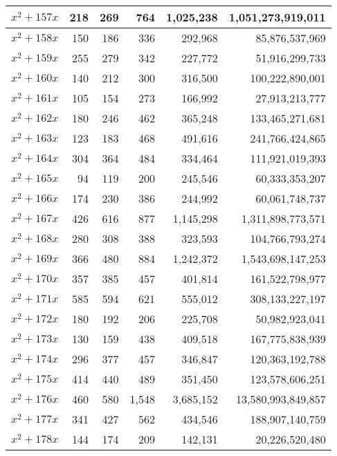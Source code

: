 \documentclass[a4paper]{amsproc}
\theoremstyle{plain}
\theoremstyle{named}
\begin{document}
\begin{longtable}{ | l | r | r | r | r | r | }
$x^2 + 157x$ & 218 & 269 & 764 & 1{,}025{,}238 & 1{,}051{,}273{,}919{,}011 \\ \hline
$x^2 + 158x$ & 150 & 186 & 336 & 292{,}968 & 85{,}876{,}537{,}969 \\ \hline
$x^2 + 159x$ & 255 & 279 & 342 & 227{,}772 & 51{,}916{,}299{,}733 \\ \hline
$x^2 + 160x$ & 140 & 212 & 300 & 316{,}500 & 100{,}222{,}890{,}001 \\ \hline
$x^2 + 161x$ & 105 & 154 & 273 & 166{,}992 & 27{,}913{,}213{,}777 \\ \hline
$x^2 + 162x$ & 180 & 246 & 462 & 365{,}248 & 133{,}465{,}271{,}681 \\ \hline
$x^2 + 163x$ & 123 & 183 & 468 & 491{,}616 & 241{,}766{,}424{,}865 \\ \hline
$x^2 + 164x$ & 304 & 364 & 484 & 334{,}464 & 111{,}921{,}019{,}393 \\ \hline
$x^2 + 165x$ & 94 & 119 & 200 & 245{,}546 & 60{,}333{,}353{,}207 \\ \hline
$x^2 + 166x$ & 174 & 230 & 386 & 244{,}992 & 60{,}061{,}748{,}737 \\ \hline
$x^2 + 167x$ & 426 & 616 & 877 & 1{,}145{,}298 & 1{,}311{,}898{,}773{,}571 \\ \hline
$x^2 + 168x$ & 280 & 308 & 388 & 323{,}593 & 104{,}766{,}793{,}274 \\ \hline
$x^2 + 169x$ & 366 & 480 & 884 & 1{,}242{,}372 & 1{,}543{,}698{,}147{,}253 \\ \hline
$x^2 + 170x$ & 357 & 385 & 457 & 401{,}814 & 161{,}522{,}798{,}977 \\ \hline
$x^2 + 171x$ & 585 & 594 & 621 & 555{,}012 & 308{,}133{,}227{,}197 \\ \hline
$x^2 + 172x$ & 180 & 192 & 206 & 225{,}708 & 50{,}982{,}923{,}041 \\ \hline
$x^2 + 173x$ & 130 & 159 & 438 & 409{,}518 & 167{,}775{,}838{,}939 \\ \hline
$x^2 + 174x$ & 296 & 377 & 457 & 346{,}847 & 120{,}363{,}192{,}788 \\ \hline
$x^2 + 175x$ & 414 & 440 & 489 & 351{,}450 & 123{,}578{,}606{,}251 \\ \hline
$x^2 + 176x$ & 460 & 580 & 1{,}548 & 3{,}685{,}152 & 13{,}580{,}993{,}849{,}857 \\ \hline
$x^2 + 177x$ & 341 & 427 & 562 & 434{,}546 & 188{,}907{,}140{,}759 \\ \hline
$x^2 + 178x$ & 144 & 174 & 209 & 142{,}131 & 20{,}226{,}520{,}480 \\ \hline

\end{longtable}
\end{document}

